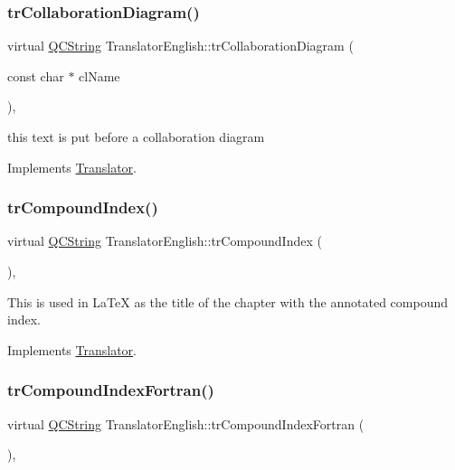 \subsubsection{\texorpdfstring{trCollaborationDiagram()}{trCollaborationDiagram()}}
{\footnotesize\ttfamily virtual \mbox{\hyperlink{class_q_c_string}{Q\+C\+String}} Translator\+English\+::tr\+Collaboration\+Diagram (\begin{DoxyParamCaption}\item[{const char $\ast$}]{cl\+Name }\end{DoxyParamCaption})\hspace{0.3cm}{\ttfamily [inline]}, {\ttfamily [virtual]}}

this text is put before a collaboration diagram 

Implements \mbox{\hyperlink{class_translator}{Translator}}.

\mbox{\label{class_translator_english_a09043b62d9ea65c6860797d867b26b50}} 
\subsubsection{\texorpdfstring{trCompoundIndex()}{trCompoundIndex()}}
{\footnotesize\ttfamily virtual \mbox{\hyperlink{class_q_c_string}{Q\+C\+String}} Translator\+English\+::tr\+Compound\+Index (\begin{DoxyParamCaption}{ }\end{DoxyParamCaption})\hspace{0.3cm}{\ttfamily [inline]}, {\ttfamily [virtual]}}

This is used in La\+TeX as the title of the chapter with the annotated compound index. 

Implements \mbox{\hyperlink{class_translator}{Translator}}.

\mbox{\label{class_translator_english_a7e568ebc767d205d76ba737c77416f24}} 
\subsubsection{\texorpdfstring{trCompoundIndexFortran()}{trCompoundIndexFortran()}}
{\footnotesize\ttfamily virtual \mbox{\hyperlink{class_q_c_string}{Q\+C\+String}} Translator\+English\+::tr\+Compound\+Index\+Fortran (\begin{DoxyParamCaption}{ }\end{DoxyParamCaption})\hspace{0.3cm}{\ttfamily [inline]}, {\ttfamily [virtual]}}

